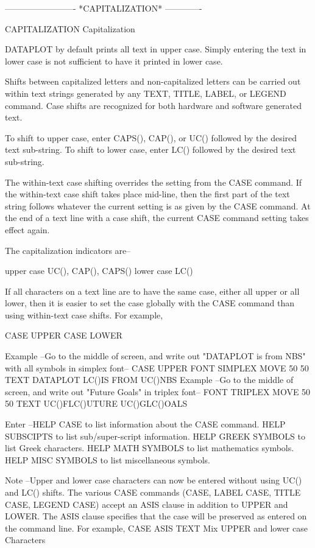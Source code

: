  
-------------------------  *CAPITALIZATION*  -------------
 
CAPITALIZATION
Capitalization
 
DATAPLOT by default prints all text in upper case.  Simply entering
the text in lower case is not sufficient to have it printed in lower
case.
 
Shifts between capitalized letters and non-capitalized letters can be
carried out within text strings generated by any TEXT, TITLE, LABEL, or
LEGEND command.  Case shifts are recognized for both hardware and
software generated text.
 
To shift to upper case, enter CAPS(), CAP(), or UC() followed by the
desired text sub-string.  To shift to lower case, enter LC() followed
by the desired text sub-string.
 
The within-text case shifting overrides the setting from the CASE
command.  If the within-text case shift takes place mid-line, then the
first part of the text string follows whatever the current setting is
as given by the CASE command.  At the end of a text line with a case
shift, the current CASE command setting takes effect again.
 
The capitalization indicators are--
 
   upper case        UC(), CAP(), CAPS()
   lower case        LC()
 
If all characters on a text line are to have the same case, either all
upper or all lower, then it is easier to set the case globally with the
CASE command than using within-text case shifts.  For example,
 
   CASE UPPER
   CASE LOWER
 
Example --Go to the middle of screen, and write out "DATAPLOT is from
          NBS" with all symbols in simplex font--
             CASE UPPER
             FONT SIMPLEX
             MOVE 50 50
             TEXT DATAPLOT LC()IS FROM UC()NBS
Example --Go to the middle of screen, and write out "Future Goals"
          in triplex font--
             FONT TRIPLEX
             MOVE 50 50
             TEXT UC()FLC()UTURE UC()GLC()OALS
 
Enter   --HELP CASE to list information about the CASE command.
          HELP SUBSCIPTS to list sub/super-script information.
          HELP GREEK SYMBOLS to list Greek characters.
          HELP MATH SYMBOLS to list mathematics symbols.
          HELP MISC SYMBOLS to list miscellaneous symbols.
 
Note    --Upper and lower case characters can now be entered without
          using UC() and LC() shifts.  The various CASE commands
          (CASE, LABEL CASE, TITLE CASE, LEGEND CASE) accept an ASIS
          clause in addition to UPPER and LOWER.  The ASIS clause
          specifies that the case will be preserved as entered on the
          command line.  For example,
              CASE ASIS
              TEXT Mix UPPER and lower case Characters
 
